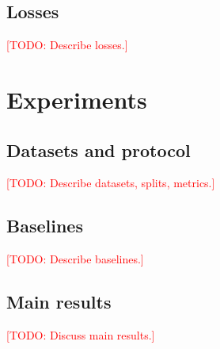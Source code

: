 \documentclass{egpubl}
\newcommand{\todo}[1]{\textcolor{red}{[TODO: #1]}}
\begin{document}
\subsection{Losses}
\todo{Describe losses.}

\section{Experiments}
\label{sec:experiments}

\subsection{Datasets and protocol}
\todo{Describe datasets, splits, metrics.}

\subsection{Baselines}
\todo{Describe baselines.}

\subsection{Main results}
\todo{Discuss main results.}
\end{document}
